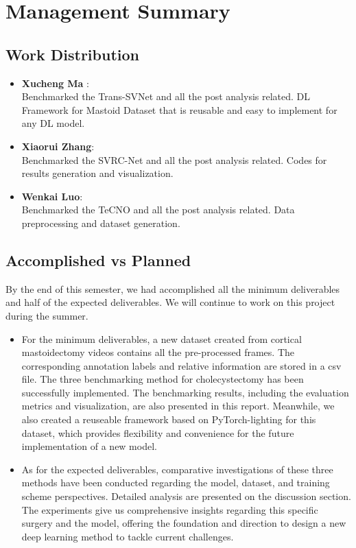 \documentclass[11pt]{article} \usepackage[top=1in, bottom=1in, left=1in, right=1in]{geometry}
\begin{document}
\newpage
\section{Management Summary}
\subsection{Work Distribution}
    \begin{itemize}
        \item \textbf{Xucheng Ma} :\\Benchmarked the Trans-SVNet and all the post analysis related. DL Framework for Mastoid Dataset that is reusable and easy to implement for any DL model.
        
        \item \textbf{Xiaorui Zhang}:\\Benchmarked the SVRC-Net and all the post analysis related. Codes for results generation and visualization.
        
        \item \textbf{Wenkai Luo}:\\Benchmarked the TeCNO and all the post analysis related. Data preprocessing and dataset generation.
    \end{itemize}
\subsection{Accomplished vs Planned}

By the end of this semester, we had accomplished all the minimum deliverables and half of the expected deliverables. We will continue to work on this project during the summer.
\begin{itemize}
    \item For the minimum deliverables,  a new dataset created from cortical mastoidectomy videos contains all the pre-processed frames. The corresponding annotation labels and relative information are stored in a csv file. The three benchmarking method for cholecystectomy has been successfully implemented. The benchmarking results, including the evaluation metrics and visualization, are also presented in this report. Meanwhile, we also created a reuseable framework based on PyTorch-lighting for this dataset, which provides flexibility and convenience for the future implementation of a new model. 
    \item As for the expected deliverables, comparative investigations of these three methods have been conducted regarding the model, dataset, and training scheme perspectives. Detailed analysis are presented on the discussion section. The experiments give us comprehensive insights regarding this specific surgery and the model, offering the foundation and direction to design a new deep learning method to tackle current challenges. 
\end{itemize}
\end{document}
